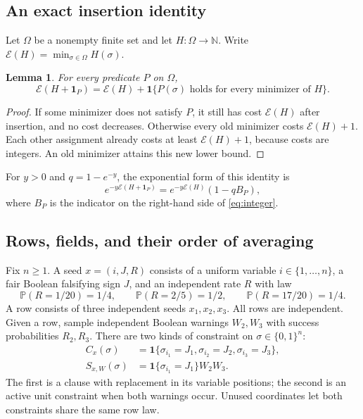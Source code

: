 \documentclass[11pt]{article}
\newtheorem{lemma}[theorem]{Lemma}
\theoremstyle{remark}
\newcommand{\Prob}{\mathbb{P}}
\newcommand{\ind}{\mathbf{1}}
\newcommand{\en}{\mathcal{E}}
\begin{document}
\subsection{An exact insertion identity}
Let $\Omega$ be a nonempty finite set and let $H:\Omega\to\mathbb{N}$.
Write $\en(H)=\min_{\sigma\in\Omega}H(\sigma)$.

\begin{lemma}\label{lem:integer}
For every predicate $P$ on $\Omega$,
\begin{equation}\label{eq:integer}
 \en(H+\ind_P)=\en(H)+
 \ind\{P(\sigma)\text{ holds for every minimizer of }H\}.
\end{equation}
\end{lemma}
\begin{proof}
If some minimizer does not satisfy $P$, it still has cost $\en(H)$ after
insertion, and no cost decreases. Otherwise every old minimizer costs
$\en(H)+1$. Each other assignment already costs at least $\en(H)+1$,
because costs are integers. An old minimizer attains this new lower bound.
\end{proof}

For $y>0$ and $q=1-e^{-y}$, the exponential form of this identity is
\begin{equation}\label{eq:expinsert}
 e^{-y\en(H+\ind_P)}=e^{-y\en(H)}(1-qB_P),
\end{equation}
where $B_P$ is the indicator on the right-hand side of
\eqref{eq:integer}.

\subsection{Rows, fields, and their order of averaging}
Fix $n\geq1$. A seed $x=(i,J,R)$ consists of a uniform variable
$i\in\{1,\ldots,n\}$, a fair Boolean falsifying sign $J$, and an
independent rate $R$ with law
\begin{equation}\label{eq:law}
 \Prob(R=1/20)=1/4,\qquad
 \Prob(R=2/5)=1/2,\qquad
 \Prob(R=17/20)=1/4.
\end{equation}
A row consists of three independent seeds $x_1,x_2,x_3$.
All rows are independent. Given a row, sample independent Boolean
warnings $W_2,W_3$ with success probabilities $R_2,R_3$.
There are two kinds of constraint on $\sigma\in\{0,1\}^n$:
\begin{align*}
 C_x(\sigma)&=\ind\{\sigma_{i_1}=J_1,
                             \sigma_{i_2}=J_2,\sigma_{i_3}=J_3\},\\
 S_{x,W}(\sigma)&=\ind\{\sigma_{i_1}=J_1\}W_2W_3.
\end{align*}
The first is a clause with replacement in its variable positions; the
second is an active unit constraint when both warnings occur. Unused
coordinates let both constraints share the same row law.
\end{document}
